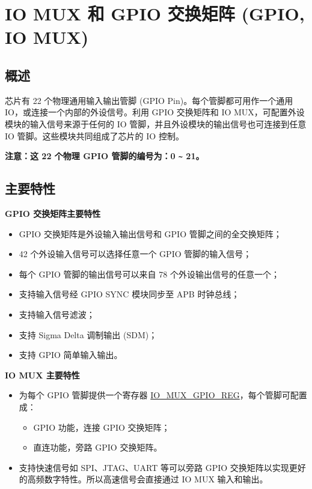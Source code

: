 \documentclass[main\_\_CN.tex]{subfiles}
\begin{document}

\ifglobal
\else
    {\let\clearpage\relax \listoftodos}
    \tableofcontents
\fi

\hypertarget{iomuxgpio}{}
\chapter{IO MUX 和 GPIO 交换矩阵 (GPIO, IO MUX)}
\label{mod:iomuxgpio}

\section{概述}

\chipname{} 芯片有 22 个物理通用输入输出管脚 (GPIO Pin)。每个管脚都可用作一个通用 IO，或连接一个内部的外设信号。利用 GPIO 交换矩阵和 IO MUX，可配置外设模块的输入信号来源于任何的 IO 管脚，并且外设模块的输出信号也可连接到任意 IO 管脚。这些模块共同组成了芯片的 IO 控制。

{\bfseries 注意：这 22 个物理 GPIO 管脚的编号为：0 \verb+~+ 21。}

\section{主要特性}

\textbf{GPIO 交换矩阵主要特性}

\begin{itemize}
\item GPIO 交换矩阵是外设输入输出信号和 GPIO 管脚之间的全交换矩阵；
\item 42 个外设输入信号可以选择任意一个 GPIO 管脚的输入信号；
\item 每个 GPIO 管脚的输出信号可以来自 78 个外设输出信号的任意一个；
\item 支持输入信号经 GPIO SYNC 模块同步至 APB 时钟总线；
\item 支持输入信号滤波；
\item 支持 Sigma Delta 调制输出 (SDM)；
\item 支持 GPIO 简单输入输出。
\end{itemize}

\textbf{IO MUX 主要特性}

\begin{itemize}
\item 为每个 GPIO 管脚提供一个寄存器 \hyperref[regdesc:IOMUXGPIONREG]{IO\_MUX\_GPIO\_REG}，每个管脚可配置成：
    \begin{itemize}
        \item GPIO 功能，连接 GPIO 交换矩阵；
        \item 直连功能，旁路 GPIO 交换矩阵。
    \end{itemize}
\item 支持快速信号如 SPI、JTAG、UART 等可以旁路 GPIO 交换矩阵以实现更好的高频数字特性。所以高速信号会直接通过 IO MUX 输入和输出。 
\end{itemize}
\end{document}
